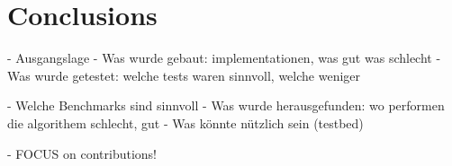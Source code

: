 \chapter{Conclusions}
\label{c:conclusions} 
- Ausgangslage
- Was wurde gebaut: implementationen, was gut was schlecht
- Was wurde getestet: welche tests waren sinnvoll, welche weniger

- Welche Benchmarks sind sinnvoll
- Was wurde herausgefunden: wo performen die algorithem schlecht, gut
- Was könnte nützlich sein (testbed)


- FOCUS on contributions!
